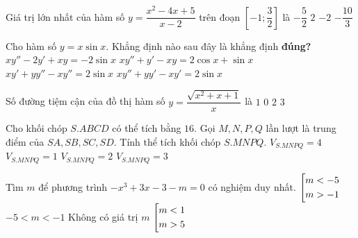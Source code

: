 \begin{ex}%
	Giá trị lớn nhất của hàm số $y=\dfrac{x^2-4x+5}{x-2}$ trên đoạn $\left[-1;\dfrac{3}{2} \right]$ là
	\choice
	{$-\dfrac{5}{2}$}
	{$2$}
	{\True $-2$}
	{$-\dfrac{10}{3}$}
\end{ex}

\begin{ex}%
	Cho hàm số $y=x\sin x$. Khẳng định nào sau đây là khẳng định \textbf{đúng?}
	\choice
	{\True $xy''-2y'+xy=-2\sin x$}
	{$xy''+y'-xy=2\cos x+\sin x$}
	{$xy'+yy''-xy''=2\sin x$}
	{$xy''+yy'-xy'=2\sin x$}
\end{ex}

\begin{ex}%
	Số đường tiệm cận của đồ thị hàm số $y=\dfrac{\sqrt{x^2+x+1}}{x}$ là
	\choice
	{$1$}
	{$0$}
	{$2$}
	{\True $3$}
\end{ex}

\begin{ex}%
	Cho khối chóp $S.ABCD$ có thể tích bằng $16$. Gọi $M, N, P, Q$ lần lượt là trung điểm của $SA, SB, SC, SD$. Tính thể tích khối chóp $S.MNPQ$.
	\choice
	{$V_{S.MNPQ}=4$}
	{$V_{S.MNPQ}=1$}
	{\True $V_{S.MNPQ}=2$}
	{$V_{S.MNPQ}=3$}
\end{ex}

\begin{ex}%
	Tìm $m$ để phương trình $-x^3+3x-3-m=0$ có nghiệm duy nhất.
	\choice
	{\True $\left[\begin{aligned}&m<-5\\&m>-1\end{aligned}\right.$}
	{$-5<m<-1$}
	{Không có giá trị $m$}
	{$\left[\begin{aligned}&m<1\\&m>5\end{aligned}\right.$}
\end{ex}

